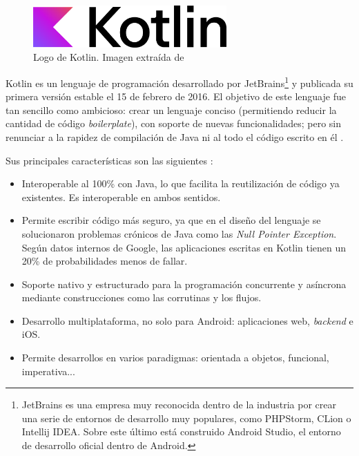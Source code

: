             \begin{figure}[h]
                \centering
                \includegraphics[width=0.66\textwidth]{figures/Kotlin logo.png}
                \caption[Logo de Kotlin.]
                {Logo de Kotlin. Imagen extraída de \cite{noauthor_kotlin_nodate-1}}
                \label{figure:kotlin:logo}
            \end{figure}

            Kotlin es un lenguaje de programación desarrollado por JetBrains\footnote{JetBrains es una
            empresa muy reconocida dentro de la industria por crear una serie de entornos de desarrollo muy populares,
            como PHPStorm, CLion o Intellij IDEA. Sobre este último está construido Android Studio, el entorno de 
            desarrollo oficial dentro de Android.} y publicada su primera versión estable el 15 de febrero de 2016.
            El objetivo de este lenguaje fue tan sencillo como ambicioso: crear un lenguaje conciso (permitiendo reducir
            la cantidad de código \textit{boilerplate}), con soporte de nuevas funcionalidades; pero sin renunciar a la rapidez de
            compilación de Java ni al todo el código escrito en él 
            \cite{rao_k_history_nodate}. \newline

            Sus principales características son las siguientes \cite{noauthor_kotlin_nodate} \cite{noauthor_enfoque_nodate}:
            \begin{itemize}
                \item Interoperable al 100\% con Java, lo que facilita la reutilización de código ya existentes. 
                Es interoperable en ambos sentidos.
                \item Permite escribir código más seguro, ya que en el diseño del lenguaje se solucionaron problemas
                crónicos de Java como las \textit{Null Pointer Exception}. Según datos internos de Google, las 
                aplicaciones escritas en Kotlin tienen un 20\% de probabilidades menos de fallar.
                \item Soporte nativo y estructurado para la programación concurrente y asíncrona mediante 
                construcciones como las corrutinas y los flujos.
                \item Desarrollo multiplataforma, no solo para Android: aplicaciones web, \textit{backend} e iOS.
                \item Permite desarrollos en varios paradigmas: orientada a objetos, funcional, imperativa...
            \end{itemize}
            

